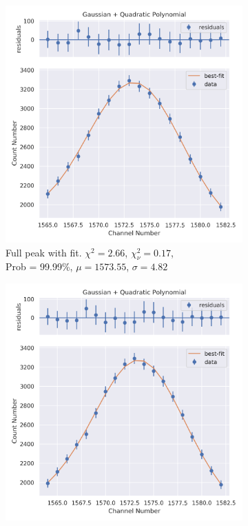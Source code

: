 \documentclass[11pt,a4paper]{article}
\begin{document}
\begin{figure}[H]
  \centering
  \begin{subfigure}{.5\linewidth}
    \centering
    \includegraphics[width=\linewidth]{./Images/Barium133/Quad/Quad_3_Full.png}
    \caption{Full peak with fit. $\chi^2 = 2.66$, $\chi^2_\nu = 0.17$, \\ Prob = 99.99\%, $\mu = 1573.55$, $\sigma = 4.82$}
  \end{subfigure}%
  \begin{subfigure}{.5\linewidth}
    \centering
    \includegraphics[width=\linewidth]{./Images/Barium133/Quad/Quad_3_Zoom.png}

\end{subfigure}
\end{figure}
\end{document}
